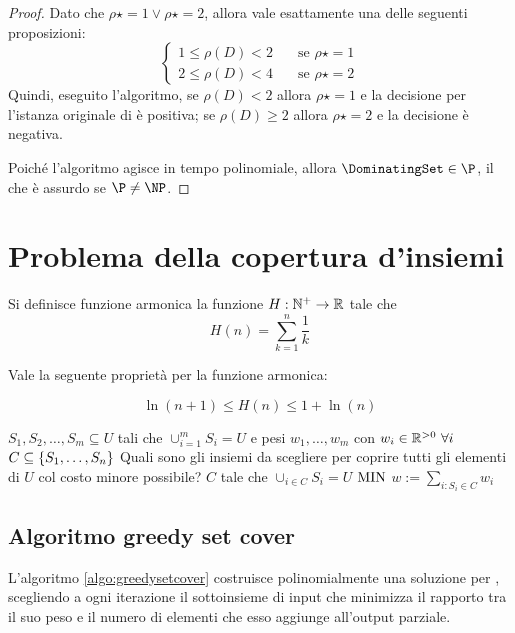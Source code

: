 \begin{proof}
	Dato che $\rho\star=1\lor\rho\star=2$, allora vale esattamente una delle seguenti proposizioni:
	\begin{equation*}
		\begin{cases}
			1\leq\rho(D)<2\quad & \text{se } \rho\star=1 \\
			2\leq\rho(D)<4\quad & \text{se } \rho\star=2
		\end{cases}
	\end{equation*}
	Quindi, eseguito l'algoritmo, se $\rho(D)<2$ allora $\rho\star=1$ e la decisione per l'istanza originale di \DominatingSet è positiva; se $\rho(D)\geq2$ allora $\rho\star=2$ e la decisione è negativa.

	Poiché l'algoritmo agisce in tempo polinomiale, allora $\DominatingSet\in\P$, il che è assurdo se $\P\neq\NP$.
\end{proof}



\section{Problema della copertura d'insiemi}
Si definisce funzione armonica la funzione $H:\mathbb N^+\to\mathbb R$ tale che
\begin{equation*}
	H(n)=\sum_{k=1}^n \frac 1k
\end{equation*}

Vale la seguente proprietà per la funzione armonica:
\begin{theorem}
	\begin{equation*}
		\ln(n+1)\leq H(n)\leq 1+\ln(n)
	\end{equation*}
\end{theorem}

\popt{\MinSetCover}
{$S_1,S_2,\dots,S_m\subseteq U$ tali che $\cup_{i=1}^m S_i=U$ e pesi $w_1,\dots,w_m$ con $w_i \in\mathbb R^{>0}~\forall i$}
{$C\subseteq\left\{ S_1,\dots,S_n \right\}$}
{Quali sono gli insiemi da scegliere per coprire tutti gli elementi di $U$ col costo minore possibile?}
{$C$ tale che $\cup_{i\in C}S_i=U$}
{$\mathrm{MIN}$}
{$w:=\sum_{i:S_i\in C} w_i$}


\subsection{Algoritmo greedy set cover}
\begin{algorithm}[ht]
	\caption{\GreedySetCover}
	\label{algo:greedysetcover}
	
\end{algorithm}
L'algoritmo \ref{algo:greedysetcover} costruisce polinomialmente una soluzione per \MinSetCover, scegliendo a ogni iterazione il sottoinsieme di input che minimizza il rapporto tra il suo peso e il numero di elementi che esso aggiunge all'output parziale.

